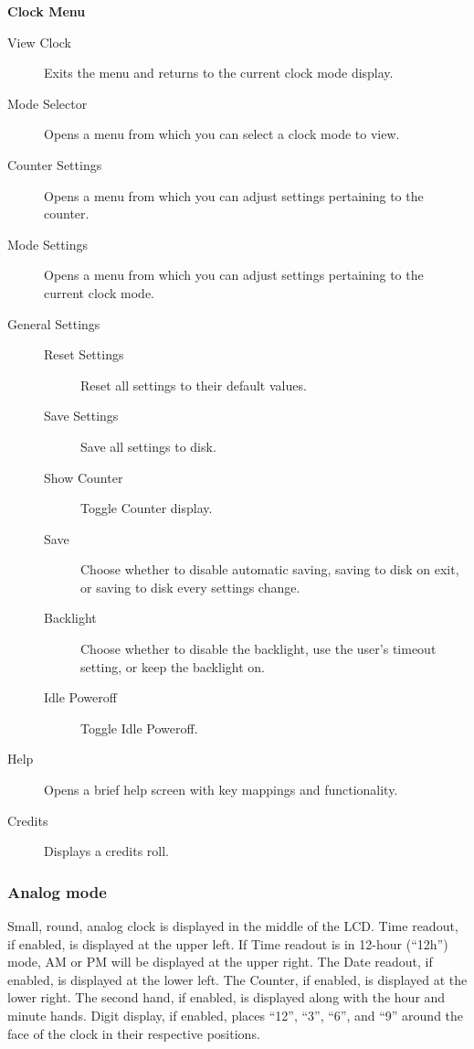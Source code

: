\textbf{Clock Menu}
\begin{description}
\item[View Clock] Exits the menu and returns to the current clock mode display.
\item[Mode Selector] Opens a menu from which you can select a clock mode to view.
\item[Counter Settings] Opens a menu from which you can adjust settings pertaining to the counter.
\item[Mode Settings] Opens a menu from which you can adjust settings pertaining to the current clock mode.
\item[General Settings]
    \begin{description}
    \item[Reset Settings]
    Reset all settings to their default values.
    \item[Save Settings]
    Save all settings to disk.
    \item[Show Counter]
    Toggle Counter display.
    \item[Save]
    Choose whether to disable automatic saving, saving to disk on exit, or saving to disk every settings change.
    \item[Backlight]
    Choose whether to disable the backlight, use the user's timeout setting, or keep the backlight on.
    \item[Idle Poweroff]
    Toggle Idle Poweroff.
    \end{description}
\item[Help] Opens a brief help screen with key mappings and functionality.
\item[Credits] Displays a credits roll.
\end{description}

\subsubsection{Analog mode}
Small, round, analog clock is displayed in the middle of the LCD.
Time readout, if enabled, is displayed at the upper left.
If Time readout is in 12-hour (``12h'') mode, AM or PM will be displayed at the upper right.
The Date readout, if enabled, is displayed at the lower left.
The Counter, if enabled, is displayed at the lower right.
The second hand, if enabled, is displayed along with the hour and minute hands.
Digit display, if enabled, places ``12'', ``3'', ``6'', and ``9'' around the face of the clock in their respective positions. 

